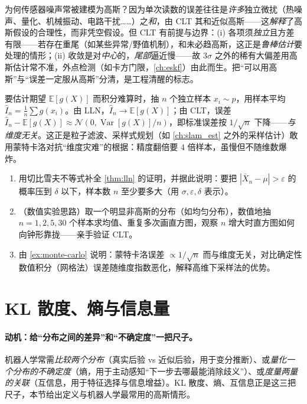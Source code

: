 \begin{insight}
为何传感器噪声常被建模为高斯？因为单次读数的误差往往是\emph{许多}独立微扰（热噪声、量化、机械振动、电路干扰……）之\emph{和}，由 CLT 其和近似高斯——这\emph{解释}了高斯假设的合理性，而非凭空假设。但 CLT 有前提与边界：(i) 各项须\emph{独立}且方差有限——若存在重尾（如某些异常/野值机制），和未必趋高斯，这正是\emph{鲁棒估计}要处理的情形；(ii) 收敛是对\emph{中心}的，\emph{尾部}逼近慢——故 $3\sigma$ 之外的稀有大偏差用高斯估计常不准，外点检测（如卡方门限，\cref{ch:eskf}）由此而生。把“可以用高斯”与“误差一定服从高斯”分清，是工程清醒的标志。
\end{insight}

\begin{example}[蒙特卡洛估计的收敛速率]\label{ex:monte-carlo}
要估计期望 $\mathbb{E}[g(X)]$ 而积分难算时，抽 $n$ 个独立样本 $x_i\sim p$，用样本平均 $\hat I_n=\frac1n\sum g(x_i)$。由 LLN，$\hat I_n\to\mathbb{E}[g(X)]$；由 CLT，误差 $\hat I_n-\mathbb{E}[g(X)]\approx\mathcal{N}(0,\operatorname{Var}[g(X)]/n)$，即标准误差按 $1/\sqrt n$ 下降——\emph{与维度无关}。这正是粒子滤波、采样式规划（如 \cref{ch:slam_est} 之外的采样估计）敢用蒙特卡洛对抗“维度灾难”的根据：精度翻倍要 $4$ 倍样本，虽慢但不随维数爆炸。
\end{example}

\begin{practice}
\begin{enumerate}
  \item 用切比雪夫不等式补全 \cref{thm:lln} 的证明，并据此说明：要把 $|\bar X_n-\mu|>\varepsilon$ 的概率压到 $\delta$ 以下，样本数 $n$ 至少要多大（用 $\sigma,\varepsilon,\delta$ 表示）。
  \item （数值实验思路）取一个明显非高斯的分布（如均匀分布），数值地抽 $n=1,2,5,30$ 个样本求均值、重复多次画直方图，观察 $n$ 增大时直方图如何向钟形靠拢——亲手验证 CLT。
  \item 由 \cref{ex:monte-carlo} 说明：蒙特卡洛误差 $\propto1/\sqrt n$ 而与维度无关，对比确定性数值积分（网格法）误差随维度指数恶化，解释高维下采样法的优势。
\end{enumerate}
\end{practice}

\section{KL 散度、熵与信息量}
\label{sec:prob-kl}

\paragraph{动机：给“分布之间的差异”和“不确定度”一把尺子。}
机器人学常需\emph{比较两个分布}（真实后验 vs 近似后验，用于变分推断）、或\emph{量化一个分布的不确定度}（熵，用于主动感知“下一步去哪最能消除歧义”）、或\emph{度量两量的关联}（互信息，用于特征选择与信息增益）。KL 散度、熵、互信息正是这三把尺子，本节给出定义与机器人学最常用的高斯情形。

